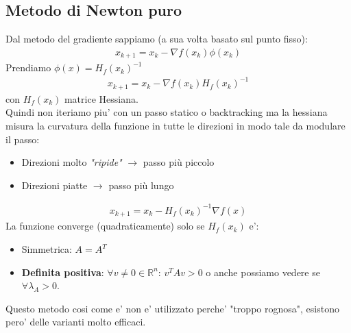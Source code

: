 \documentclass[a4paper,12pt]{article}
\begin{document}
\subsection{Metodo di Newton puro}
Dal metodo del gradiente sappiamo (a sua volta basato sul punto fisso):
\begin{align*}
      x_{k+1} = x_k - \nabla f(x_k) \phi(x_k) 
\end{align*}
Prendiamo $\phi(x) = H_f(x_k)^{-1}$
\begin{align*}
    x_{k+1} = x_k - \nabla f(x_k) H_f(x_k)^{-1}
\end{align*}
con $H_f(x_k)$ matrice Hessiana.\\
Quindi non iteriamo piu' con un passo statico o backtracking ma la hessiana misura la curvatura della funzione in tutte le direzioni in modo tale da modulare il passo:
\begin{itemize}
    \item Direzioni molto \textit{"ripide"} $\to$ passo più piccolo
    \item Direzioni piatte $\to$ passo più lungo
\end{itemize}
\begin{align*}
    \boxed{x_{k+1} = x_k - H_f(x_k)^{-1}\nabla f(x)}
\end{align*}
La funzione converge (quadraticamente) solo se $H_f(x_k)$ e':
\begin{itemize}
    \item Simmetrica: $A=A^T$
    \item \textbf{Definita positiva}: $\forall v\neq 0 \in \mathbb{R}^n: \, v^T A v>0$ o anche possiamo vedere se $\forall \lambda_A > 0$. 
\end{itemize}
Questo metodo cosi come e' non e' utilizzato perche' "troppo rognosa", esistono pero' delle varianti molto efficaci.
\end{document}
